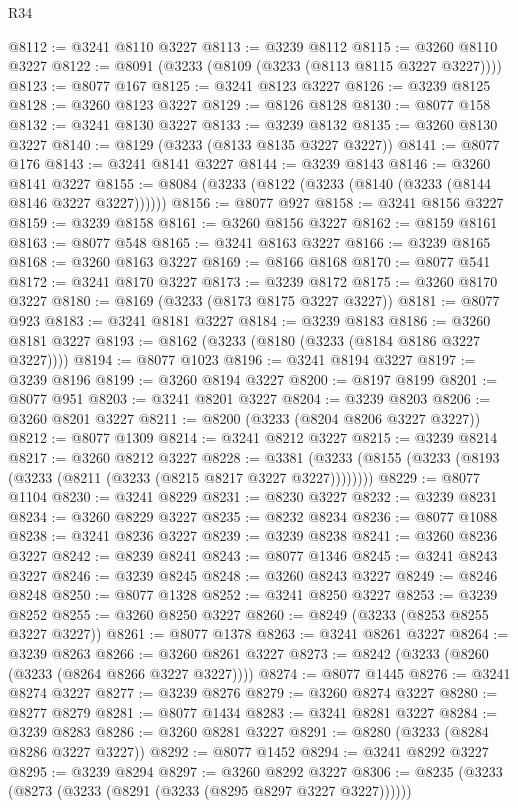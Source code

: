 \begin{lexlean}{R34}
\begin{coremodule}
@8112 := @3241 @8110 @3227
@8113 := @3239 @8112
@8115 := @3260 @8110 @3227
@8122 := @8091 (@3233 (@8109 (@3233 (@8113 @8115 @3227 @3227))))
@8123 := @8077 @167
@8125 := @3241 @8123 @3227
@8126 := @3239 @8125
@8128 := @3260 @8123 @3227
@8129 := @8126 @8128
@8130 := @8077 @158
@8132 := @3241 @8130 @3227
@8133 := @3239 @8132
@8135 := @3260 @8130 @3227
@8140 := @8129 (@3233 (@8133 @8135 @3227 @3227))
@8141 := @8077 @176
@8143 := @3241 @8141 @3227
@8144 := @3239 @8143
@8146 := @3260 @8141 @3227
@8155 := @8084 (@3233 (@8122 (@3233 (@8140 (@3233 (@8144 @8146 @3227 @3227))))))
@8156 := @8077 @927
@8158 := @3241 @8156 @3227
@8159 := @3239 @8158
@8161 := @3260 @8156 @3227
@8162 := @8159 @8161
@8163 := @8077 @548
@8165 := @3241 @8163 @3227
@8166 := @3239 @8165
@8168 := @3260 @8163 @3227
@8169 := @8166 @8168
@8170 := @8077 @541
@8172 := @3241 @8170 @3227
@8173 := @3239 @8172
@8175 := @3260 @8170 @3227
@8180 := @8169 (@3233 (@8173 @8175 @3227 @3227))
@8181 := @8077 @923
@8183 := @3241 @8181 @3227
@8184 := @3239 @8183
@8186 := @3260 @8181 @3227
@8193 := @8162 (@3233 (@8180 (@3233 (@8184 @8186 @3227 @3227))))
@8194 := @8077 @1023
@8196 := @3241 @8194 @3227
@8197 := @3239 @8196
@8199 := @3260 @8194 @3227
@8200 := @8197 @8199
@8201 := @8077 @951
@8203 := @3241 @8201 @3227
@8204 := @3239 @8203
@8206 := @3260 @8201 @3227
@8211 := @8200 (@3233 (@8204 @8206 @3227 @3227))
@8212 := @8077 @1309
@8214 := @3241 @8212 @3227
@8215 := @3239 @8214
@8217 := @3260 @8212 @3227
@8228 := @3381 (@3233 (@8155 (@3233 (@8193 (@3233 (@8211 (@3233 (@8215 @8217 @3227 @3227))))))))
@8229 := @8077 @1104
@8230 := @3241 @8229
@8231 := @8230 @3227
@8232 := @3239 @8231
@8234 := @3260 @8229 @3227
@8235 := @8232 @8234
@8236 := @8077 @1088
@8238 := @3241 @8236 @3227
@8239 := @3239 @8238
@8241 := @3260 @8236 @3227
@8242 := @8239 @8241
@8243 := @8077 @1346
@8245 := @3241 @8243 @3227
@8246 := @3239 @8245
@8248 := @3260 @8243 @3227
@8249 := @8246 @8248
@8250 := @8077 @1328
@8252 := @3241 @8250 @3227
@8253 := @3239 @8252
@8255 := @3260 @8250 @3227
@8260 := @8249 (@3233 (@8253 @8255 @3227 @3227))
@8261 := @8077 @1378
@8263 := @3241 @8261 @3227
@8264 := @3239 @8263
@8266 := @3260 @8261 @3227
@8273 := @8242 (@3233 (@8260 (@3233 (@8264 @8266 @3227 @3227))))
@8274 := @8077 @1445
@8276 := @3241 @8274 @3227
@8277 := @3239 @8276
@8279 := @3260 @8274 @3227
@8280 := @8277 @8279
@8281 := @8077 @1434
@8283 := @3241 @8281 @3227
@8284 := @3239 @8283
@8286 := @3260 @8281 @3227
@8291 := @8280 (@3233 (@8284 @8286 @3227 @3227))
@8292 := @8077 @1452
@8294 := @3241 @8292 @3227
@8295 := @3239 @8294
@8297 := @3260 @8292 @3227
@8306 := @8235 (@3233 (@8273 (@3233 (@8291 (@3233 (@8295 @8297 @3227 @3227))))))

\end{coremodule}
\end{lexlean}
